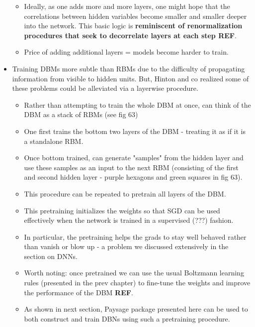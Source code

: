 \documentclass[norsk,a4paper,11pt]{article}
\begin{document}
\begin{itemize}
\begin{itemize}
		\item Ideally, as one adds more and more layers, one might hope that the correlations between hidden variables become smaller and smaller deeper into the network. This basic logic is \textbf{reminiscent of renormalization procedures that seek to decorrelate layers at each step REF}. 
		\item Price of adding additional layers = models become harder to train.
	\end{itemize}
	\item Training DBMs more subtle than RBMs due to the difficulty of propagating information from visible to hidden units. But, Hinton and co realized some of these problems could be alleviated via a layerwise procedure. 
	\begin{itemize}
		\item Rather than attempting to train the whole DBM at once, can think of the DBM as a stack of RBMs (see fig 63)
		\item One first trains the bottom two layers of the DBM - treating it as if it is a standalone RBM.
		\item Once bottom trained, can generate "samples" from the hidden layer and use these samples as an input to the next RBM (consisting of the first and second hidden layer - purple hexagons and green squares in fig 63).
		\item This procedure can be repeated to pretrain all layers of the DBM.
		\item This pretraining initializes the weights so that SGD can be used effectively when the network is trained in a supervised (???) fashion.
		\item In particular, the pretraining helps the grads to stay well behaved rather than vanish or blow up - a problem we discussed extensively in the section on DNNs.
		\item Worth noting: once pretrained we can use the usual Boltzmann learning rules (presented in the prev chapter) to fine-tune the weights and improve the performance of the DBM \textbf{REF}.
		\item As shown in next section, Paysage package presented here can be used to both construct and train DBNs using such a pretraining procedure.
	\end{itemize}
\end{itemize}
\end{document}

